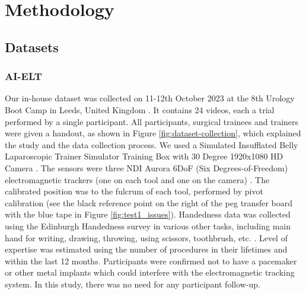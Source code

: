\section{Methodology}

\subsection{Datasets}

\subsubsection{AI-ELT}

Our in-house dataset was collected on 11-12th October 2023 at the 8th Urology Boot Camp in Leeds, United Kingdom \cite{urology2023}. It contains 24 videos, each a trial performed by a single participant. All participants, surgical trainees and trainers were given a handout, as shown in Figure \ref{fig:dataset-collection}, which explained the study and the data collection process. We used a Simulated Insufflated Belly Laparoscopic Trainer Simulator Training Box with 30 Degree 1920x1080 HD Camera \cite{aliexpress}. The sensors were three NDI Aurora 6DoF (Six Degrees-of-Freedom) electromagnetic trackers (one on each tool and one on the camera) \cite{hummel_design_2005}. The calibrated position was to the fulcrum of each tool, performed by pivot calibration (see the black reference point on the right of the peg transfer board with the blue tape in Figure \ref{fig:test1_issues}). Handedness data was collected using the Edinburgh Handedness survey in various other tasks, including main hand for writing, drawing, throwing, using scissors, toothbrush, etc. \cite{oldfield_assessment_1971}. Level of expertise was estimated using the number of procedures in their lifetimes and within the last 12 months. Participants were confirmed not to have a pacemaker or other metal implants which could interfere with the electromagnetic tracking system. In this study, there was no need for any participant follow-up.


